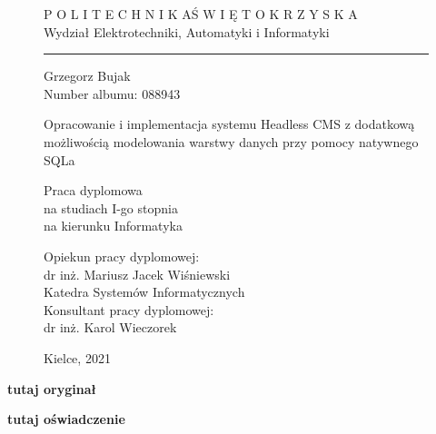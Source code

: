 \begin{figure}
    \arialsection
    \bfseries

    \centering
    \Large P O L I T E C H N I K A\quad Ś W I Ę T O K R Z Y S K A \\
    Wydział Elektrotechniki, Automatyki i Informatyki\\
    \rule{\linewidth}{1pt}

    \vspace{4cm}

    Grzegorz Bujak\\
    Number albumu: 088943\\
    \vspace{2cm}

    \LARGE Opracowanie i implementacja systemu Headless CMS 
    z dodatkową możliwością modelowania
    warstwy danych przy pomocy natywnego SQLa\\
    \vspace{1cm}

    \large Praca dyplomowa\\
    na studiach I-go stopnia\\
    na kierunku Informatyka\\
    \vspace{4cm}

    \normalfont
    \arialsection
    \raggedleft Opiekun pracy dyplomowej:\\
    dr inż. Mariusz Jacek Wiśniewski\\
    Katedra Systemów Informatycznych\\
    \vspace{.5cm}
    Konsultant pracy dyplomowej:\\
    dr inż. Karol Wieczorek\\
    \vspace{1cm}

    \centering
    Kielce, 2021
\end{figure}

\vspace{1cm}

\afterpage{\null\newpage}
\clearpage

{\centering\bfseries\Huge tutaj oryginał}

\afterpage{\null\newpage}
\clearpage

{\centering\bfseries\Huge tutaj oświadczenie}

\afterpage{\null\newpage}
\clearpage

